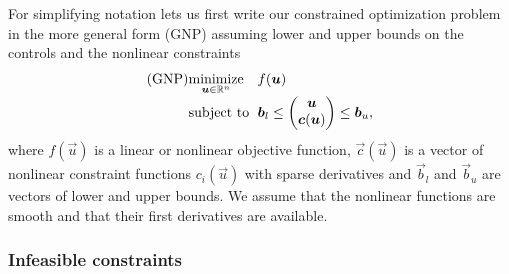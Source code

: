\documentclass[twocolumn,numbook]{svjour3}          %
\makeatletter
\def\u{{\vec u}}
\def\c{{\vec c}}
\def\b{{\vec b}}
\def\A{{\vec A}}
\def\minim{\mathop{\hbox{\rm minimize}}}
\def\minimize#1{{\displaystyle\minim_{#1}}}
\def\subject{\mbox{\rm subject to}}
\def\strutl{\rule[-1.25ex]{0pt}{3ex}}%
\def\problem#1#2#3#4{%
   {\begin{tabular*}{0.47\textwidth}
    {@{}l@{\extracolsep{\fill}}l@{\extracolsep{6pt}}l@{\extracolsep{\fill}}c@{}}
      #1 & $\minimize{#2}$ & $#3$ & $ $ \\[5pt]
         & $\subject$      & $#4$ & $ $
    \end{tabular*}}}
\newcommand{\pmat}[1]{\begin{pmatrix}#1\end{pmatrix}}
\makeatother
\begin{document}
For simplifying notation lets us first write our constrained optimization problem in the more 
general form (GNP) assuming lower and upper bounds on the controls and the nonlinear
constraints
$$
   \problem{(GNP)}{\u \in \mathbb R^n}{f(\u)}
      {\b_l \le \pmat{\u\\\c(\u)\strutl} \le \b_u,}
$$
where $f(\u)$ is a linear or nonlinear objective function,
$\c(\u)$ is a vector of nonlinear constraint functions $c_i(\u)$
with sparse derivatives and $\b_l$ and $\b_u$
are vectors of lower and upper bounds.
We assume that the nonlinear functions are smooth and that their first
derivatives are available.

\subsubsection{Infeasible constraints} \label{sec-infeas}
\end{document}
